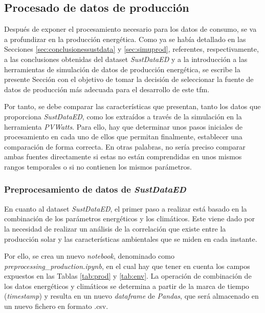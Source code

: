 \subsection{Procesado de datos de producción}
\label{sec:procprod}

Después de exponer el procesamiento necesario para los datos de consumo, se va a profundizar en la producción energética. Como ya se había detallado en las Secciones \ref{sec:conclusionessustdata} y \ref{sec:simuprod},  referentes, respectivamente, a las conclusiones obtenidas del dataset \textit{SustDataED} y a la introducción a las herramientas de simulación de datos de producción energética, se escribe la presente Sección con el objetivo de tomar la decisión de seleccionar la fuente de datos de producción más adecuada para el desarrollo de este \gls{tfm}.

\vspace{3mm}

Por tanto, se debe comparar las características que presentan, tanto los datos que proporciona \textit{SustDataED}, como los extraídos a través de la simulación en la herramienta \textit{PVWatts}. Para ello, hay que determinar unos pasos iniciales de procesamiento en cada uno de ellos que permitan finalmente, establecer una comparación de forma correcta. En otras palabras, no sería preciso comparar ambas fuentes directamente si estas no están comprendidas en unos mismos rangos temporales o si no contienen los mismos parámetros. 

\subsubsection{Preprocesamiento de datos de \textit{SustDataED}}
\label{sec:preprocsust}

En cuanto al dataset \textit{SustDataED}, el primer paso a realizar está basado en la combinación de los parámetros energéticos y los climáticos. Este viene dado por la necesidad de realizar un análisis de la correlación que existe entre la producción solar y las características ambientales que se miden en cada instante. 

\vspace{3mm}

Por ello, se crea un nuevo \textit{notebook}, denominado como \textit{preprocessing\_production.ipynb}, en el cual hay que tener en cuenta los campos expuestos en las Tablas \ref{tab:prod} y \ref{tab:env}. La operación de combinación de los datos energéticos y climáticos se determina a partir de la marca de tiempo (\textit{timestamp}) y resulta en un nuevo \textit{dataframe} de \textit{Pandas}, que será almacenado en un nuevo fichero en formato .csv.

